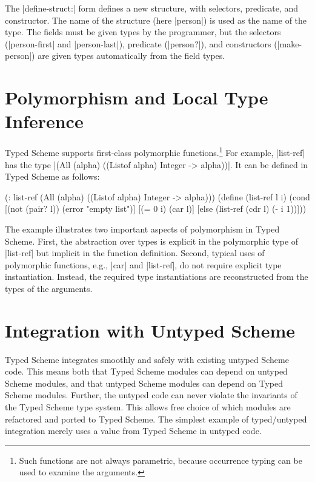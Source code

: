 \begin{schemeregion}
The \scheme|define-struct:| form defines a new structure, with
selectors, predicate, and constructor. The name of the structure (here
\scheme|person|) is used as the name of the type.  The fields must be
given types by the programmer, but the selectors
(\scheme|person-first| and \scheme|person-last|), predicate
(\scheme|person?|), and
constructors (\scheme|make-person|) are given types automatically from
the field types.   

\section{Polymorphism and Local Type Inference} 
\label{sec:poly}
Typed Scheme supports first-class polymorphic functions.\footnote{Such
functions are not always parametric, because occurrence typing can be used
to examine the arguments.}
  For example, \scheme|list-ref| has the type
\scheme|(All (alpha) ((Listof alpha) Integer -> alpha))|.  It can be
defined in Typed Scheme as follows:
\begin{exmp}
\begin{schemedisplay}
(: list-ref (All (alpha) ((Listof alpha) Integer -> alpha)))
(define (list-ref l i)
   (cond [(not (pair? l)) (error "empty list")]
         [(= 0 i) (car l)]
         [else (list-ref (cdr l) (- i 1))]))
\end{schemedisplay}
\label{ex:list-ref}
\end{exmp}
The example illustrates two important aspects of polymorphism in Typed
 Scheme.  First, the abstraction over types is explicit in the polymorphic
 type of \scheme|list-ref| but implicit in the function definition. Second,
 typical uses of polymorphic functions, e.g., \scheme|car| and
 \scheme|list-ref|, do not require explicit type instantiation.  Instead,
 the required type instantiations are reconstructed from the types of the
 arguments.  

\section{Integration with Untyped Scheme}
\label{sec:integrate}
Typed Scheme integrates smoothly and safely  with existing untyped
Scheme code.  This means both that Typed Scheme modules can depend on
untyped Scheme modules, and that untyped Scheme modules can depend on Typed
Scheme modules. Further, the untyped code can never violate the
invariants of the Typed Scheme type system. This allows free choice of which modules are
refactored and ported to Typed Scheme.  The simplest example of
typed/untyped integration merely uses a value from Typed Scheme in
untyped code.


\end{schemeregion}
